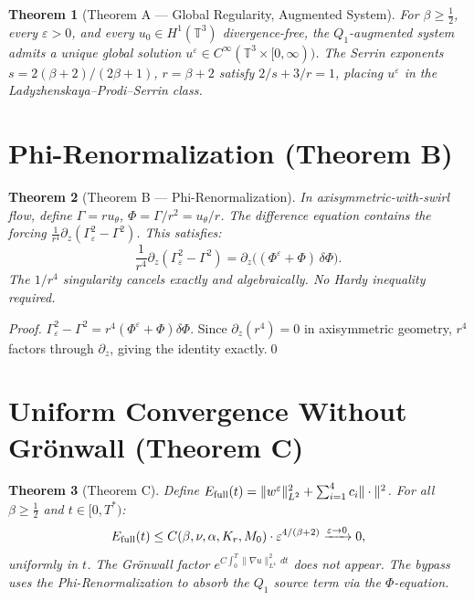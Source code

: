\documentclass[11pt]{article}
\newtheorem{theorem}{Theorem}[section]
\begin{document}
\begin{theorem}[Theorem A --- Global Regularity, Augmented System]
For $\beta\geq\tfrac{1}{2}$, every $\varepsilon>0$, and every $u_0\in H^1(\mathbb{T}^3)$ divergence-free,
the $Q_1$-augmented system admits a unique global solution $u^\varepsilon\in C^\infty(\mathbb{T}^3\times[0,\infty))$.
The Serrin exponents $s=2(\beta+2)/(2\beta+1)$, $r=\beta+2$ satisfy $2/s+3/r=1$,
placing $u^\varepsilon$ in the Ladyzhenskaya--Prodi--Serrin class.
\end{theorem}

\section{Phi-Renormalization (Theorem B)}

\begin{theorem}[Theorem B --- Phi-Renormalization]
In axisymmetric-with-swirl flow, define $\Gamma=ru_\theta$, $\Phi=\Gamma/r^2=u_\theta/r$.
The difference equation contains the forcing $\frac{1}{r^4}\partial_z(\Gamma_\varepsilon^2-\Gamma^2)$.
This satisfies:
\[\frac{1}{r^4}\partial_z(\Gamma_\varepsilon^2-\Gamma^2) = \partial_z\bigl((\Phi^\varepsilon+\Phi)\,\delta\Phi\bigr).\]
The $1/r^4$ singularity cancels \emph{exactly and algebraically}. No Hardy inequality required.
\end{theorem}

\begin{proof}
$\Gamma_\varepsilon^2-\Gamma^2 = r^4(\Phi^\varepsilon+\Phi)\delta\Phi$.
Since $\partial_z(r^4)=0$ in axisymmetric geometry, $r^4$ factors through $\partial_z$, giving the identity exactly.\qed
\end{proof}

\section{Uniform Convergence Without Gr\"onwall (Theorem C)}

\begin{theorem}[Theorem C]
Define $E_{\rm full}(t) = \|w^\varepsilon\|_{L^2}^2 + \sum_{i=1}^4 c_i\|\cdot\|^2$.
For all $\beta\geq\tfrac{1}{2}$ and $t\in[0,T^*)$:
\[E_{\rm full}(t) \leq C(\beta,\nu,\alpha,K_r,M_0)\cdot\varepsilon^{4/(\beta+2)}\xrightarrow{\varepsilon\to 0}0,\]
uniformly in $t$. The Gr\"onwall factor $e^{C\int_0^T\|\nabla u\|_{L^4}^2\,dt}$ does not appear.
The bypass uses the Phi-Renormalization to absorb the $Q_1$ source term via the $\Phi$-equation.
\end{theorem}
\end{document}
